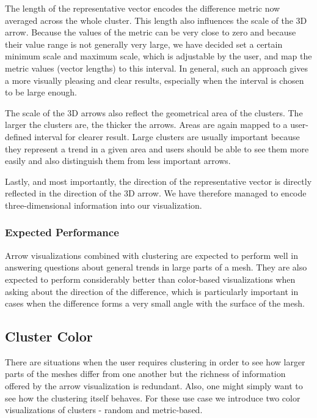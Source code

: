 The length of the representative vector encodes the difference metric now averaged across the whole cluster. This length also influences the scale of the 3D arrow. Because the values of the metric can be very close to zero and because their value range is not generally very large, we have decided set a certain minimum scale and maximum scale, which is adjustable by the user, and map the metric values (vector lengths) to this interval. In general, such an approach gives a more visually pleasing and clear results, especially when the interval is chosen to be large enough.

The scale of the 3D arrows also reflect the geometrical area of the clusters. The larger the clusters are, the thicker the arrows. Areas are again mapped to a user-defined interval for clearer result. Large clusters are usually important because they represent a trend in a given area and users should be able to see them more easily and also distinguish them from less important arrows.

Lastly, and most importantly, the direction of the representative vector is directly reflected in the direction of the 3D arrow. We have therefore managed to encode three-dimensional information into our visualization.

\subsubsection{Expected Performance}

Arrow visualizations combined with clustering are expected to perform well in answering questions about general trends in large parts of a mesh. They are also expected to perform considerably better than color-based visualizations when asking about the direction of the difference, which is particularly important in cases when the difference forms a very small angle with the surface of the mesh.
\subsection{Cluster Color}

There are situations when the user requires clustering in order to see how larger parts of the meshes differ from one another but the richness of information offered by the arrow visualization is redundant. Also, one might simply want to see how the clustering itself behaves. For these use case we introduce two color visualizations of clusters - random and metric-based.

